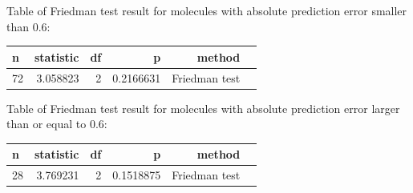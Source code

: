 Table of Friedman test result for molecules with absolute prediction
error smaller than \(0.6\):


\begin{center}
    \begin{table}[H]
\begin{tabular}{lrrrrl}
\toprule
 n & statistic & df & p & method \\
\midrule
 72 & 3.058823 & 2 & 0.2166631 & Friedman test \\
\bottomrule
\end{tabular}
\end{table}
\end{center}


Table of Friedman test result for molecules with absolute prediction
error larger than or equal to \(0.6\):


\begin{center}
    \begin{table}[H]
\begin{tabular}{lrrrrl}
\toprule
n & statistic & df & p & method \\
\midrule
28 & 3.769231 & 2 & 0.1518875 & Friedman test \\
\bottomrule
\end{tabular}
\end{table}
\end{center}

